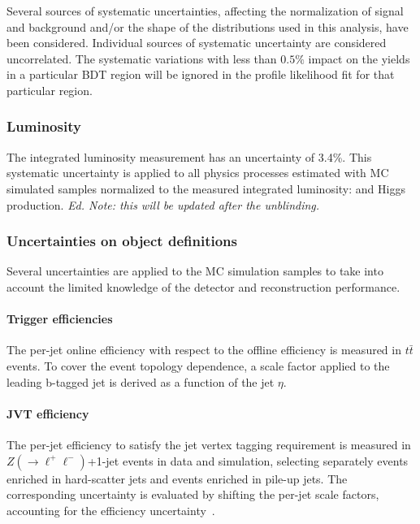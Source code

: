 \label{sec:vbf-uncertainties}

Several sources of systematic uncertainties,
affecting the normalization of signal and background and/or the shape of
the distributions used in this analysis, have been considered.  Individual sources of systematic 
uncertainty are considered uncorrelated. The systematic variations with less than $0.5\%$ impact 
on the yields in a particular BDT region will be ignored in the profile likelihood fit for 
that particular region. 

\subsubsection{Luminosity}
\label{sec:vbf-syst_lumi}

The integrated luminosity measurement has an uncertainty of 3.4\%. This systematic uncertainty
is applied to all physics processes estimated with MC simulated samples normalized 
to the measured integrated luminosity: \zjets{} and Higgs production. {\it Ed. Note: this will be updated after the unblinding.}

\subsubsection{Uncertainties on object definitions}
\label{sec:vbf-syst_objects}

Several uncertainties are applied to the MC simulation samples to take into account the limited knowledge of the detector and reconstruction performance.

\paragraph{Trigger efficiencies}

The per-jet online \btagging efficiency with respect to the offline \btagging efficiency is measured in $t\bar t$ events. 
To cover the event topology dependence, a scale factor applied to the leading b-tagged jet is derived as a function of the jet $\eta$. 

\paragraph{JVT efficiency}
The per-jet efficiency to satisfy the jet vertex tagging requirement
is measured in $Z(\to \ell^+\ell^-)$+1-jet events in data and simulation,
selecting separately events enriched in hard-scatter jets and events enriched in pile-up jets. 
The corresponding uncertainty is evaluated by shifting the per-jet scale factors,
accounting for the efficiency uncertainty~\cite{JVTwiki}.

